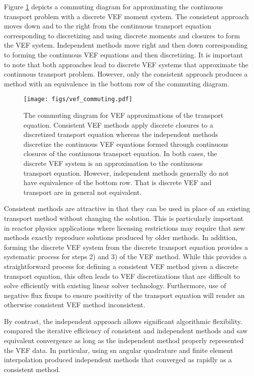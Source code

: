 \documentclass[../doc.tex]{subfiles}
\begin{document}
Figure \ref{vef:commuting} depicts a commuting diagram for approximating the continuous transport problem with a discrete VEF moment system. The consistent approach moves down and to the right from the continuous transport equation corresponding to discretizing and using discrete moments and closures to form the VEF system. Independent methods move right and then down corresponding to forming the continuous VEF equations and then discretizing. It is important to note that both approaches lead to discrete VEF systems that approximate the continuous transport problem. However, only the consistent approach produces a method with an equivalence in the bottom row of the commuting diagram.
\begin{figure}
\centering
\texttt{[image: figs/vef\_commuting.pdf]}
\caption{The commuting diagram for VEF approximations of the transport equation. Consistent VEF methods apply discrete closures to a discretized transport equation whereas the independent methods discretize the continuous VEF equations formed through continuous closures of the continuous transport equation. In both cases, the discrete VEF system is an approximation to the continuous transport equation. However, independent methods generally do not have equivalence of the bottom row. That is discrete VEF and transport are in general not equivalent.}
\label{vef:commuting}
\end{figure}

Consistent methods are attractive in that they can be used in place of an existing transport method without changing the solution. This is particularly important in reactor physics applications where licensing restrictions may require that new methods exactly reproduce solutions produced by older methods. In addition, forming the discrete VEF system from the discrete transport equation provides a systematic process for steps 2) and 3) of the VEF method. While this provides a straightforward process for defining a consistent VEF method given a discrete transport equation, this often leads to VEF discretizations that are difficult to solve efficiently with existing linear solver technology. Furthermore, use of negative flux fixups to ensure positivity of the transport equation will render an otherwise consistent VEF method inconsistent. 

By contrast, the independent approach allows significant algorithmic flexibility. 
\textcite{two-level-independent-warsa} compared the iterative efficiency of consistent and independent methods and saw equivalent convergence as long as the independent method properly represented the VEF data. In particular, using \gls{sn} angular quadrature and finite element interpolation produced independent methods that converged as rapidly as a consistent method. 

\end{document}
